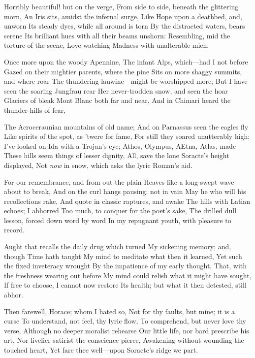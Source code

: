 \documentclass[10pt,twocolumn]{book}
\begin{document}
   Horribly beautiful! but on the verge,
   From side to side, beneath the glittering morn,
   An Iris sits, amidst the infernal surge,
   Like Hope upon a deathbed, and, unworn
   Its steady dyes, while all around is torn
   By the distracted waters, bears serene
   Its brilliant hues with all their beams unshorn:
   Resembling, mid the torture of the scene,
Love watching Madness with unalterable mien.


   Once more upon the woody Apennine,
   The infant Alps, which---had I not before
   Gazed on their mightier parents, where the pine
   Sits on more shaggy summits, and where roar
   The thundering lauwine---might be worshipped more;
   But I have seen the soaring Jungfrau rear
   Her never-trodden snow, and seen the hoar
   Glaciers of bleak Mont Blanc both far and near,
And in Chimari heard the thunder-hills of fear,


   The Acroceraunian mountains of old name;
   And on Parnassus seen the eagles fly
   Like spirits of the spot, as 'twere for fame,
   For still they soared unutterably high:
   I've looked on Ida with a Trojan's eye;
   Athos, Olympus, AEtna, Atlas, made
   These hills seem things of lesser dignity,
   All, save the lone Soracte's height displayed,
Not \textit{now} in snow, which asks the lyric Roman's aid.


   For our remembrance, and from out the plain
   Heaves like a long-swept wave about to break,
   And on the curl hangs pausing:  not in vain
   May he who will his recollections rake,
   And quote in classic raptures, and awake
   The hills with Latian echoes; I abhorred
   Too much, to conquer for the poet's sake,
   The drilled dull lesson, forced down word by word
In my repugnant youth, with pleasure to record.


   Aught that recalls the daily drug which turned
   My sickening memory; and, though Time hath taught
   My mind to meditate what then it learned,
   Yet such the fixed inveteracy wrought
   By the impatience of my early thought,
   That, with the freshness wearing out before
   My mind could relish what it might have sought,
   If free to choose, I cannot now restore
Its health; but what it then detested, still abhor.


   Then farewell, Horace; whom I hated so,
   Not for thy faults, but mine; it is a curse
   To understand, not feel, thy lyric flow,
   To comprehend, but never love thy verse,
   Although no deeper moralist rehearse
   Our little life, nor bard prescribe his art,
   Nor livelier satirist the conscience pierce,
   Awakening without wounding the touched heart,
Yet fare thee well---upon Soracte's ridge we part.
\end{document}
